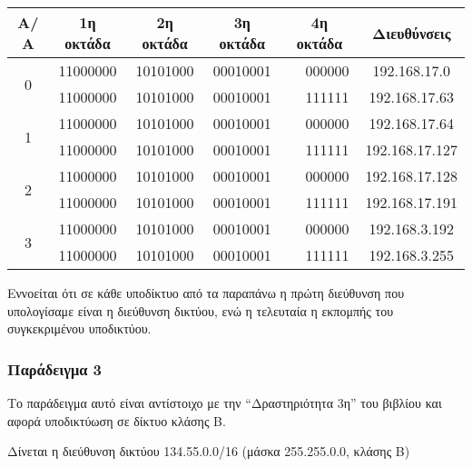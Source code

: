 \begin{center}
\fontsize{10}{12}
\ttfamily
\begin{tabular}{|c|c|c|c|c|c|c|}
\hline
                Α/Α  & 1η οκτάδα  & 2η οκτάδα  & 3η οκτάδα  & \multicolumn{2}{c|}{ 4η οκτάδα }  & Διευθύνσεις \\ \hline

\multirow{2}{*}{0} & 11000000 & 10101000 & 00010001 & \multirow{2}{*}{\colorbox{red}{\color{white}{00}}}  & 000000 & 192.168.17.0 \\ \cline{2-4} \cline{6-7} 
                  & 11000000 & 10101000 & 00010001 &                    & 111111 & 192.168.17.63  \\ \hline

\multirow{2}{*}{1} & 11000000  & 10101000 & 00010001  & \multirow{2}{*}{\colorbox{red}{\color{white}{01}}}  & 000000  & 192.168.17.64 \\ \cline{2-4} \cline{6-7} 
                  & 11000000 & 10101000 & 00010001 &                    & 111111 & 192.168.17.127 \\ \hline
\multirow{2}{*}{2} & 11000000  & 10101000  & 00010001 & \multirow{2}{*}{\colorbox{red}{\color{white}{10}}}  & 000000 & 192.168.17.128 \\ \cline{2-4} \cline{6-7} 
                  & 11000000 & 10101000  & 00010001 &                    & 111111 & 192.168.17.191 \\ \hline
\multirow{2}{*}{3} & 11000000  & 10101000 & 00010001  & \multirow{2}{*}{\colorbox{red}{\color{white}{11}}}  & 000000 & 192.168.3.192 \\ \cline{2-4} 
\cline{6-7} 
                  & 11000000 & 10101000  & 00010001 &                    & 111111 & 192.168.3.255 \\ \hline
\end{tabular}
\normalfont
\end{center}

Εννοείται ότι σε κάθε υποδίκτυο από τα παραπάνω η πρώτη διεύθυνση που υπολογίσαμε είναι η διεύθυνση δικτύου, ενώ η τελευταία η εκπομπής του συγκεκριμένου υποδικτύου.

\subsubsection*{Παράδειγμα 3}

Το παράδειγμα αυτό είναι αντίστοιχο με την ``Δραστηριότητα 3η'' του βιβλίου και αφορά υποδικτύωση σε δίκτυο κλάσης B.

Δίνεται η διεύθυνση δικτύου 134.55.0.0/16 (μάσκα 255.255.0.0, κλάσης B)

